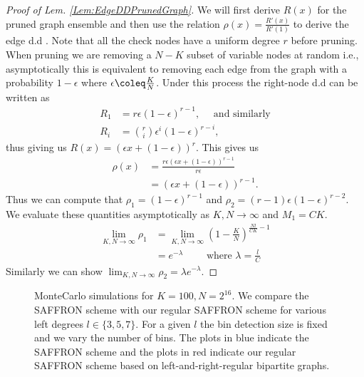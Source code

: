 \documentclass[conference,twocolumn]{IEEEtran}
\begin{document}
\begin{proof}[Proof of Lem. \ref{Lem:EdgeDDPrunedGraph}]
We will first derive $R(x)$ for the pruned graph ensemble and then use the relation\cite{richardson2008modern} $\rho(x)=\frac{R'(x)}{R'(1)}$ to derive the edge d.d . Note that all the check nodes have a uniform degree $r$ before pruning. When pruning we are removing a $N-K$ subset of variable nodes at random i.e., asymptotically this is equivalent to removing each edge from the graph with a probability $1-\epsilon$ where $\epsilon\coleq \frac{K}{N}$. Under this process the right-node d.d can be written as
\begin{align*}
R_1&=r\epsilon(1-\epsilon)^{r-1},\quad \text{ and similarly}\\
R_i &=\binom{r}{i} \epsilon^{i}(1-\epsilon)^{r-i},
\end{align*}
thus giving us $R(x)=(\epsilon x+(1-\epsilon))^{r}$. This gives us 
\begin{align*}
\rho(x)&=\frac{r\epsilon(\epsilon x+(1-\epsilon))^{r-1}}{r\epsilon}\\
          &=(\epsilon x+(1-\epsilon))^{r-1}.
\end{align*}
Thus we can compute that $\rho_1=(1-\epsilon)^{r-1}$ and $\rho_2=(r-1)\epsilon(1-\epsilon)^{r-2}$. We evaluate these quantities asymptotically as $K,N\rightarrow \infty$ and $M_1=CK$.
\begin{align*}
\lim_{K,N\rightarrow \infty} \rho_1&=\lim_{K,N\rightarrow \infty} (1-\frac{K}{N})^{\frac{Nl}{CK}-1}\\
&=e^{-\lambda} \qquad \text{ where } \lambda=\frac{l}{C}
\end{align*}
Similarly we can show $\lim_{K,N\rightarrow \infty}\rho_2=\lambda e^{-\lambda}$.
\end{proof}

\begin{figure}
\label{Fig:SimulationNoiseless}
\begin{center}
\resizebox{\columnwidth}{!}{}
\caption{MonteCarlo simulations for $K=100, N=2^{16}$. We compare the SAFFRON scheme with our regular SAFFRON scheme for various left degrees $l\in\{3,5,7\}$. For a given $l$ the bin detection size is fixed and we vary the number of bins. The plots in blue indicate the SAFFRON scheme and the plots in red indicate our regular SAFFRON scheme based on left-and-right-regular bipartite graphs.}
\end{center}
\end{figure}
\end{document}
